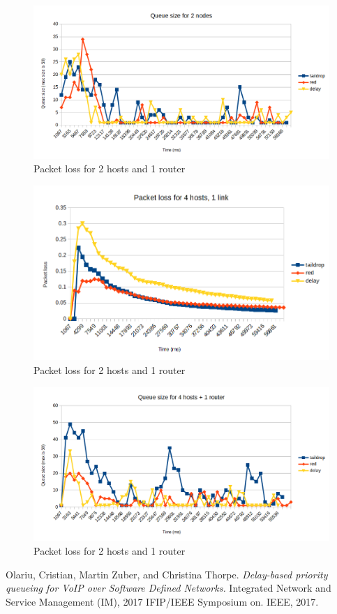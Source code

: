 \documentclass[12pt]{article}
\begin{document}
\begin{figure}[H]
    \centering
    \includegraphics{figure2.png}
    \centering
    \caption{Packet loss for 2 hosts and 1 router}
\end{figure} 

\begin{figure}[H]
    \centering
    \includegraphics{figure3.png}
    \centering
    \caption{Packet loss for 2 hosts and 1 router}
\end{figure} 

\begin{figure}[H]
    \centering
    \includegraphics{figure4.png}
    \centering
    \caption{Packet loss for 2 hosts and 1 router}
\end{figure} 
 

\begin{thebibliography}{9}


	Olariu, Cristian, Martin Zuber, and Christina Thorpe. \emph{Delay-based priority queueing for VoIP over Software Defined Networks.} Integrated Network and Service Management (IM), 2017 IFIP/IEEE Symposium on. IEEE, 2017.
\end{thebibliography}
\end{document}
